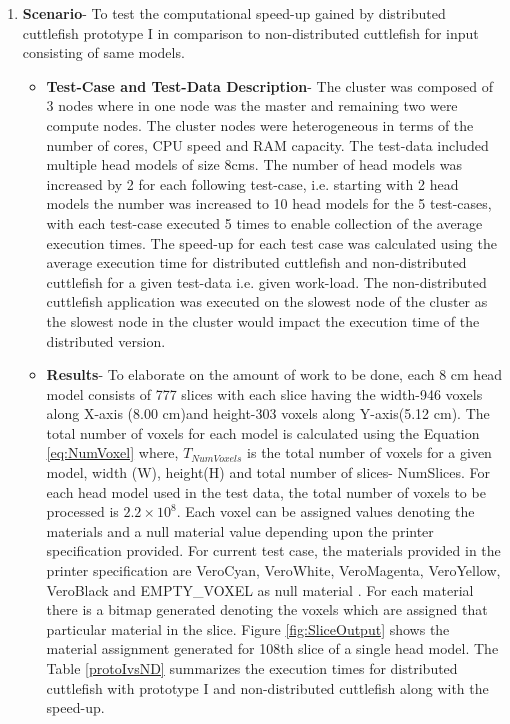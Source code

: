 \begin{enumerate}
\item{\textbf{Scenario}}- To test the computational speed-up gained by distributed cuttlefish prototype I in comparison to non-distributed cuttlefish for input consisting of same models.
\begin{itemize}
\item{\textbf{Test-Case and Test-Data Description}}- The cluster was composed of 3 nodes where in one node was the master and remaining two were compute nodes. The cluster nodes were heterogeneous in terms of the number of cores, CPU speed and RAM capacity. The test-data included multiple head models of size 8cms. The number of head models was increased by 2 for each following test-case, i.e. starting with 2 head models the number was increased to 10 head models for the 5 test-cases, with each test-case executed 5 times to enable collection of the average execution times. The speed-up for each test case was calculated using the average execution time for distributed cuttlefish and non-distributed cuttlefish for a given test-data i.e. given work-load. The non-distributed cuttlefish application was executed on the slowest node of the cluster as the slowest node in the cluster would impact the execution time of the distributed version. 
\item{\textbf{Results}}- To elaborate on the amount of work to be done, each 8 cm head model consists of 777 slices with each slice having the width-946 voxels along X-axis (8.00 cm)and height-303 voxels along Y-axis(5.12 cm). The total number of voxels for each model is calculated using the Equation \ref{eq:NumVoxel} where, \begin{math} T_{NumVoxels} \end{math} is the total number of voxels for a given model, width (W), height(H) and total number of slices- NumSlices. For each head model used in the test data, the total number of voxels to be processed is \begin{math} 2.2 \times 10^{8} \end{math}. Each voxel can be assigned values denoting the materials and a null material value depending upon the printer specification provided. For current test case, the materials provided in the printer specification are VeroCyan, VeroWhite, VeroMagenta, VeroYellow, VeroBlack and EMPTY\_VOXEL as null material . For each material there is a bitmap generated denoting the voxels which are assigned that particular material in the slice. Figure \ref{fig:SliceOutput} shows the material assignment generated for 108th slice of a single head model. The Table \ref{protoIvsND} summarizes the execution times for distributed cuttlefish with prototype I and non-distributed cuttlefish along with the speed-up.  

\end{itemize}
\end{enumerate}
